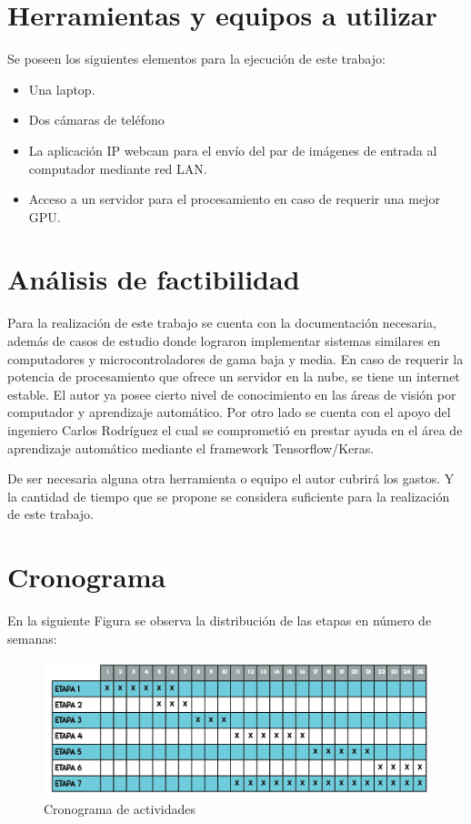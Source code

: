 \documentclass[letterpaper,titlepage,12pt,oneside,spanish,final]{report_eie}
\numberwithin{equation}{chapter}%
\numberwithin{figure}{chapter}%
\numberwithin{table}{chapter}%
\numberwithin{definition}{chapter}%
\numberwithin{lemma}{chapter}%
\numberwithin{theorem}{chapter}%
\numberwithin{corollary}{chapter}%
\numberwithin{condition}{chapter}%
\numberwithin{criterion}{chapter}%
\numberwithin{problem}{chapter}%
\numberwithin{property}{chapter}%
\numberwithin{proposition}{chapter}%
\numberwithin{solution}{chapter}%
\numberwithin{conjecture}{chapter}%
\begin{document}
\section*{Herramientas y equipos a utilizar}
Se poseen los siguientes elementos para la ejecución de este trabajo:
\begin{itemize}
    \item Una laptop.
    \item Dos cámaras de teléfono
    \item La aplicación IP webcam para el envío del par de imágenes de entrada al computador mediante red LAN.
    \item Acceso a un servidor para el procesamiento en caso de requerir una mejor GPU.
\end{itemize}
\section*{Análisis de factibilidad}
Para la realización de este trabajo se cuenta con la documentación necesaria, además de casos de estudio donde lograron implementar sistemas similares en computadores y microcontroladores de gama baja y media. En caso de requerir la potencia de procesamiento que ofrece un servidor en la nube, se tiene un internet estable. El autor ya posee cierto nivel de conocimiento en las áreas de visión por computador y aprendizaje automático. Por otro lado se cuenta con el apoyo del ingeniero Carlos Rodríguez el cual se comprometió en prestar ayuda en el área de aprendizaje automático mediante el framework Tensorflow/Keras.

De ser necesaria alguna otra herramienta o equipo el autor cubrirá los gastos. Y la cantidad de tiempo que se propone se considera suficiente para la realización de este trabajo.
\section*{Cronograma}
En la siguiente Figura se observa la distribución de las etapas en  número de semanas:
\begin{figure}[H]
    \centering
    \includegraphics{Anteproyecto/cronogramaNuevo.png}
    \caption{Cronograma de actividades}
    \label{cronograma}
\end{figure}
\end{document}
